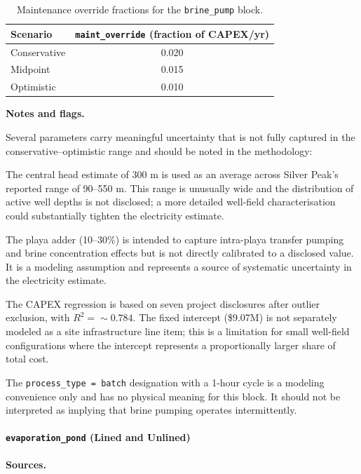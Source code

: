 \begin{table}[h!]
\caption{Maintenance override fractions for the \texttt{brine\_pump} block.}
\centering
\begin{tabular}{lc}
\toprule
\textbf{Scenario} & \texttt{maint\_override} (fraction of CAPEX/yr) \\
\midrule
Conservative & 0.020 \\
Midpoint     & 0.015 \\
Optimistic   & 0.010 \\
\bottomrule
\end{tabular}
\end{table}

\medskip
\noindent\textbf{Notes and flags.}\quad

Several parameters carry meaningful uncertainty that is not fully captured in the conservative--optimistic range and should be noted in the methodology:

The central head estimate of 300 m is used as an average across Silver Peak's reported range of 90--550 m. This range is unusually wide and the distribution of active well depths is not disclosed; a more detailed well-field characterisation could substantially tighten the electricity estimate.

The playa adder (10--30\%) is intended to capture intra-playa transfer pumping and brine concentration effects but is not directly calibrated to a disclosed value. It is a modeling assumption and represents a source of systematic uncertainty in the electricity estimate.

The CAPEX regression is based on seven project disclosures after outlier exclusion, with $R^2=\sim 0.784$. The fixed intercept (\$9.07M) is not separately modeled as a site infrastructure line item; this is a limitation for small well-field configurations where the intercept represents a proportionally larger share of total cost.

The \texttt{process\_type = batch} designation with a 1-hour cycle is a modeling convenience only and has no physical meaning for this block. It should not be interpreted as implying that brine pumping operates intermittently.

\clearpage
\paragraph{\texttt{evaporation\_pond} (Lined and Unlined)}\label{app:04-methods-blockdefs-evappond}

\medskip
\noindent\textbf{Sources.}\quad

